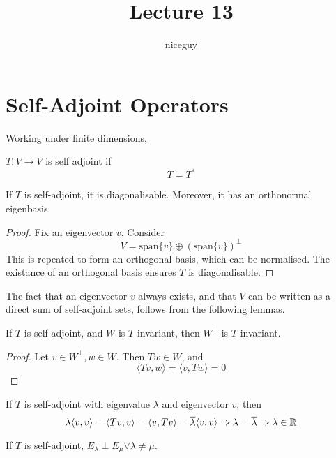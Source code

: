 \documentclass[12pt]{article}
\author{niceguy}
\title{Lecture 13}
\begin{document}
\maketitle

\section{Self-Adjoint Operators}

Working under finite dimensions,

\begin{defn}
	$T:V\rightarrow V$ is self adjoint if
	$$T=T^*$$
\end{defn}

\begin{thm}
	If $T$ is self-adjoint, it is diagonalisable. Moreover, it has an orthonormal eigenbasis.
\end{thm}

\begin{proof}
	Fix an eigenvector $v$. Consider
	$$V = \text{span}\{v\} \oplus (\text{span}\{v\})^\perp$$
	This is repeated to form an orthogonal basis, which can be normalised. The existance of an orthogonal basis ensures $T$ is diagonalisable.
\end{proof}

The fact that an eigenvector $v$ always exists, and that $V$ can be written as a direct sum of self-adjoint sets, follows from the following lemmas.

\begin{lem}
	If $T$ is self-adjoint, and $W$ is $T$-invariant, then $W^\perp$ is $T$-invariant.
\end{lem}

\begin{proof}
	Let $v \in W^\perp, w \in W$. Then $Tw \in W$, and
	$$\langle Tv, w \rangle = \langle v,Tw \rangle = 0$$
\end{proof}

\begin{lem}
	If $T$ is self-adjoint with eigenvalue $\lambda$ and eigenvector $v$, then
	$$\lambda\langle v,v \rangle = \langle Tv,v \rangle = \langle v,Tv \rangle = \overline{\lambda}\langle v,v \rangle \Rightarrow \lambda = \overline{\lambda} \Rightarrow \lambda \in \mathbb{R}$$
\end{lem}

\begin{lem}
	If $T$ is self-adjoint, $E_\lambda \perp E_\mu \forall \lambda \neq \mu$.
\end{lem}
\end{document}

